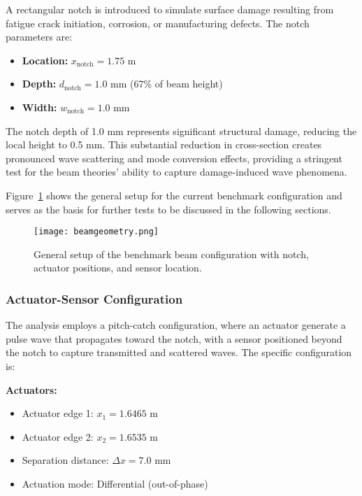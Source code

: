 \documentclass[12pt,a4paper]{report}
\begin{document}
A rectangular notch is introduced to simulate surface damage resulting from fatigue crack initiation, corrosion, or manufacturing defects. The notch parameters are:

\begin{itemize}
    \item \textbf{Location:} $x_{\text{notch}} = 1.75$ m
    \item \textbf{Depth:} $d_{\text{notch}} = 1.0$ mm (67\% of beam height)
    \item \textbf{Width:} $w_{\text{notch}} = 1.0$ mm
\end{itemize}

The notch depth of 1.0 mm represents significant structural damage, reducing the local height to 0.5 mm. This substantial reduction in cross-section creates pronounced wave scattering and mode conversion effects, providing a stringent test for the beam theories' ability to capture damage-induced wave phenomena.

Figure~\ref{fig:benchmark_geometry} shows the general setup for the current benchmark configuration and serves as the basis for further tests to be discussed in the following sections.

\begin{figure}[h]
\centering
\texttt{[image: beamgeometry.png]}
\caption{General setup of the benchmark beam configuration with notch, actuator positions, and sensor location.}
\label{fig:benchmark_geometry}
\end{figure}

\subsubsection{Actuator-Sensor Configuration}

The analysis employs a pitch-catch configuration, where an actuator generate a pulse wave that propagates toward the notch, with a sensor positioned beyond the notch to capture transmitted and scattered waves. The specific configuration is:

\textbf{Actuators:}
\begin{itemize}
    \item Actuator edge 1: $x_1 = 1.6465$ m
    \item Actuator edge 2: $x_2 = 1.6535$ m
    \item Separation distance: $\Delta x = 7.0$ mm
    \item Actuation mode: Differential (out-of-phase)
\end{itemize}
\end{document}
